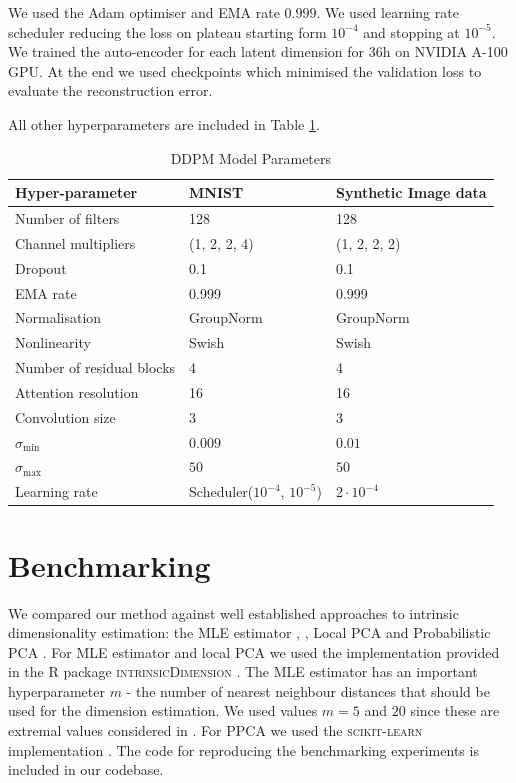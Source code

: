 We used the Adam optimiser and EMA rate $0.999$. We used learning rate scheduler reducing the loss on plateau starting form $10^{-4}$ and stopping at $10^{-5}$. We trained the auto-encoder for each latent dimension for 36h on NVIDIA A-100 GPU. At the end we used checkpoints which minimised the validation loss to evaluate the reconstruction error.

All other hyperparameters are included in Table \ref{ch3:tab:model_params}.

\begin{table}[h]
\centering
\begin{tabular}{|l|l|l|}
\hline
\textbf{Hyper-parameter} & \textbf{MNIST} & \textbf{Synthetic Image data} \\
\hline
Number of filters & 128 & 128 \\
\hline
Channel multipliers & (1, 2, 2, 4) & (1, 2, 2, 2) \\
\hline
Dropout & 0.1 & 0.1 \\
\hline
EMA rate & 0.999 & 0.999 \\
\hline
Normalisation & GroupNorm & GroupNorm \\
\hline
Nonlinearity & Swish & Swish \\
\hline
Number of residual blocks & 4 & 4 \\
\hline
Attention resolution & 16 & 16 \\
\hline
Convolution size & 3 & 3 \\
\hline
$\sigma_\text{min}$ & $0.009$ & $0.01$ \\
\hline
$\sigma_\text{max}$ & $50$ & $50$  \\
\hline
Learning rate & Scheduler($10^{-4}$, $10^{-5}$) & $2 \cdot 10^{-4}$ \\
\hline
\end{tabular}

\caption{DDPM Model Parameters}
\label{ch3:tab:model_params}
\end{table}

\section{Benchmarking}
\label{ch3:sec:benchmark}
We compared our method against well established approaches to intrinsic dimensionality estimation: the MLE estimator \cite{dim_MLE}, \cite{haro_mle}, Local PCA \cite{fan_local_pca} and Probabilistic PCA \cite{auto_ppca} \cite{ppca}. For MLE estimator and local PCA we used the implementation provided in the R package  \textsc{intrinsicDimension} \cite{R_intrinsic_dim}. The MLE estimator has an important hyperparameter $m$ - the number of nearest neighbour distances that should be used for the dimension estimation. We used values $m=5$ and $20$ since these are extremal values considered in \cite{pope2021intrinsic}. For PPCA we used the \textsc{scikit-learn} implementation \cite{sklearn}. The code for reproducing the benchmarking experiments is included in our codebase.

